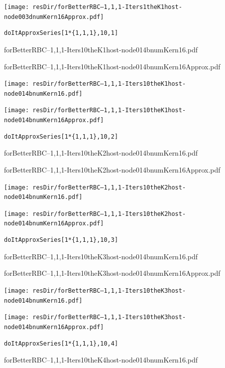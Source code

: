 \documentclass[12pt]{article}
\begin{document}
  \texttt{[image: resDir/forBetterRBC--1,1,1-Iters1theK1host-node003dnumKern16Approx.pdf]}
\fi
\newpage

\begin{verbatim}
doItApproxSeries[1*{1,1,1},10,1]
\end{verbatim}

forBetterRBC--1,1,1-Iters10theK1host-node014bnumKern16.pdf


forBetterRBC--1,1,1-Iters10theK1host-node014bnumKern16Approx.pdf


\ifmacosx
  \fi
\iflinux
  \texttt{[image: resDir/forBetterRBC--1,1,1-Iters10theK1host-node014bnumKern16.pdf]}

  \texttt{[image: resDir/forBetterRBC--1,1,1-Iters10theK1host-node014bnumKern16Approx.pdf]}
\fi

\newpage

\begin{verbatim}
doItApproxSeries[1*{1,1,1},10,2]
\end{verbatim}

forBetterRBC--1,1,1-Iters10theK2host-node014bnumKern16.pdf


forBetterRBC--1,1,1-Iters10theK2host-node014bnumKern16Approx.pdf


\ifmacosx
  \fi
\iflinux
  \texttt{[image: resDir/forBetterRBC--1,1,1-Iters10theK2host-node014bnumKern16.pdf]}

  \texttt{[image: resDir/forBetterRBC--1,1,1-Iters10theK2host-node014bnumKern16Approx.pdf]}
\fi


\newpage

\begin{verbatim}
doItApproxSeries[1*{1,1,1},10,3]
\end{verbatim}

forBetterRBC--1,1,1-Iters10theK3host-node014bnumKern16.pdf


forBetterRBC--1,1,1-Iters10theK3host-node014bnumKern16Approx.pdf


\ifmacosx
  \fi
\iflinux
  \texttt{[image: resDir/forBetterRBC--1,1,1-Iters10theK3host-node014bnumKern16.pdf]}

  \texttt{[image: resDir/forBetterRBC--1,1,1-Iters10theK3host-node014bnumKern16Approx.pdf]}
\fi


\newpage

\begin{verbatim}
doItApproxSeries[1*{1,1,1},10,4]
\end{verbatim}

forBetterRBC--1,1,1-Iters10theK4host-node014bnumKern16.pdf
\end{document}
